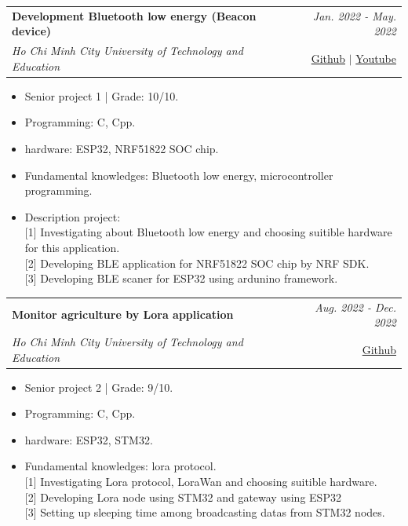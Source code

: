 \documentclass[a4paper,11pt]{article}
\makeatletter
\newcommand{\resumeProject}[4]{
\vspace{0.5mm}\item
    \begin{tabular*}{0.98\textwidth}[t]{l@{\extracolsep{\fill}}r}
        \textbf{#1} & \textit{\footnotesize{#3}} \\
        \footnotesize{\textit{#2}} & \footnotesize{#4}
    \end{tabular*}
    \vspace{-2.4mm}
}
\newcommand{\resumeItemListStart}{\begin{justify}\begin{itemize}[leftmargin=3ex, rightmargin=2ex, noitemsep,labelsep=1.2mm,itemsep=0mm]\small}
\newcommand{\resumeItemListEnd}{\end{itemize}\end{justify}\vspace{-2mm}}
\makeatother
\begin{document}
    \resumeProject
      {Development Bluetooth low energy (Beacon device)} %
      {Ho Chi Minh City University of Technology and Education} %
      {Jan. 2022 - May. 2022}
      {\href{https://github.com/Winxkin/beaconapplication}{Github} $|$ \href{https://www.youtube.com/watch?v=Auvf9YhzOnM}{Youtube}}
      \resumeItemListStart
        \item {Senior project 1 | Grade: 10/10.}
        \item {Programming: C, Cpp.}
        \item {hardware: ESP32, NRF51822 SOC chip.}
        \item {Fundamental knowledges: Bluetooth low energy, microcontroller programming.}
        \item {Description project:}\hfill
        \\ {[1] Investigating about Bluetooth low energy and choosing suitible hardware for this application.}
        \\ {[2] Developing BLE application for NRF51822 SOC chip by NRF SDK.}
        \\ {[3] Developing BLE scaner for ESP32 using ardunino framework.}
    \resumeItemListEnd

    \resumeProject
      {Monitor agriculture by Lora application}%
      {Ho Chi Minh City University of Technology and Education}%
      {Aug. 2022 - Dec. 2022}
      {\href{https://github.com/Winxkin/monitor_agriculture}{Github}}
      \resumeItemListStart
        \item {Senior project 2 | Grade: 9/10.}
        \item {Programming: C, Cpp.}
        \item {hardware: ESP32, STM32.}
        \item {Fundamental knowledges: lora protocol.}\hfill
        \\ {[1] Investigating Lora protocol, LoraWan and choosing suitible hardware.}
        \\ {[2] Developing Lora node using STM32 and gateway using ESP32}
        \\ {[3] Setting up sleeping time among broadcasting datas from STM32 nodes.}
    \resumeItemListEnd

      
\end{document}
